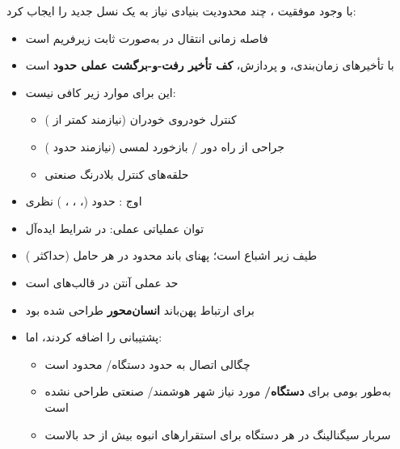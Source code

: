 
با وجود موفقیت ، چند محدودیت بنیادی نیاز به یک نسل جدید را ایجاب کرد:


\begin{itemize}
\tightlist
\item
  فاصله زمانی انتقال  در  به‌صورت ثابت  زیرفریم است
\item
  با تأخیرهای زمان‌بندی،  و پردازش، \textbf{کف تأخیر رفت-و-برگشت عملی حدود } است
\item
  این برای موارد زیر کافی نیست:

  \begin{itemize}
  \tightlist
  \item
    کنترل خودروی خودران (نیازمند کمتر از )
  \item
    جراحی از راه دور /\allowbreak{} بازخورد لمسی (نیازمند حدود )
  \item
    حلقه‌های کنترل بلادرنگ صنعتی
  \end{itemize}
\end{itemize}


\begin{itemize}
\tightlist
\item
  اوج : حدود  (، ، ، )  نظری
\item
  توان عملیاتی عملی:  در شرایط ایده‌آل
\item
  طیف زیر  اشباع است؛ پهنای باند محدود در هر حامل (حداکثر )
\item
   حد عملی آنتن در قالب‌های  است
\end{itemize}


\begin{itemize}
\tightlist
\item
   برای ارتباط پهن‌باند \textbf{انسان‌محور} طراحی شده بود
\item
   پشتیبانی  را اضافه کردند، اما:

  \begin{itemize}
  \tightlist
  \item
    چگالی اتصال به حدود  دستگاه/\allowbreak{} محدود است
  \item
    به‌طور بومی برای \textbf{ دستگاه/\allowbreak{}} مورد نیاز شهر هوشمند/\allowbreak{} صنعتی طراحی نشده است
  \item
    سربار سیگنالینگ در هر دستگاه برای استقرارهای انبوه بیش از حد بالاست
  \end{itemize}
\end{itemize}

